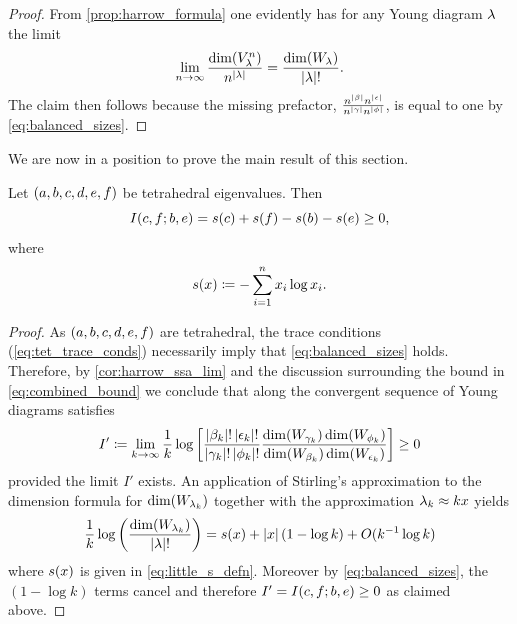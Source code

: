 \documentclass[notitlepage, 10pt]{article}
\begin{document}
\begin{proof}
    From \cref{prop:harrow_formula} one evidently has for any Young diagram $\lambda$ the limit
    \begin{equation}
        \lim_{n\to\infty} \frac{\dim(V_{\lambda}^{n})}{n^{\left|\lambda\right|}} = \frac{\dim(W_{\lambda})}{\left|\lambda\right|!}.
    \end{equation}
    The claim then follows because the missing prefactor, $\frac{n^{\left|\beta\right|}n^{\left|\epsilon\right|}}{n^{\left|\gamma\right|}n^{\left|\phi\right|}}$, is equal to one by \cref{eq:balanced_sizes}.
\end{proof}
We are now in a position to prove the main result of this section.
\begin{thm}
    Let $(a,b,c,d,e,f)$ be tetrahedral eigenvalues.
    Then 
    \begin{equation}
        I(c, f; b, e)  = s(c) + s(f) - s(b) - s(e) \geq 0,
    \end{equation} 
    where 
    \begin{equation}
        \label{eq:little_s_defn}
        s(x) \coloneqq - \sum_{i=1}^{n} x_i \log x_i.
    \end{equation}
\end{thm}
\begin{proof}
    As $(a,b,c,d,e,f)$ are tetrahedral, the trace conditions (\cref{eq:tet_trace_conds}) necessarily imply that \cref{eq:balanced_sizes} holds.
    Therefore, by \cref{cor:harrow_ssa_lim} and the discussion surrounding the bound in \cref{eq:combined_bound} we conclude that along the convergent sequence of Young diagrams satisfies
    \begin{equation}
        I' \coloneqq \lim_{k\to\infty} \frac{1}{k} \log \left[\frac{\left|\beta_k\right|!\left|\epsilon_k\right|!}{\left|\gamma_k\right|!\left|\phi_k\right|!}
        \frac{\dim(W_{\gamma_k}) \dim(W_{\phi_k})}{\dim(W_{\beta_k}) \dim(W_{\epsilon_k})}\right] \geq 0
    \end{equation}
    provided the limit $I'$ exists.
    An application of Stirling's approximation \cite{robbins1955remark} to the dimension formula for $\dim(W_{\lambda_k})$ together with the approximation $\lambda_k \approx k x$ yields
    \begin{equation}
        \frac{1}{k}\log \left(\frac{\dim(W_{\lambda_k})}{\left|\lambda\right|!}\right) = s(x) + \left|x\right| (1-\log k) + O(k^{-1}\log k)
    \end{equation}
    where $s(x)$ is given in \cref{eq:little_s_defn}.
    Moreover by \cref{eq:balanced_sizes}, the $(1-\log k)$ terms cancel and therefore $I' = I(c, f; b, e) \geq 0$ as claimed above.
\end{proof}
\end{document}
